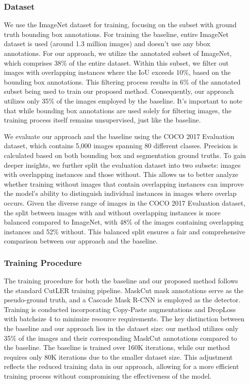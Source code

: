 \subsubsection{Dataset}
We use the ImageNet dataset for training, focusing on the subset with ground truth bounding box annotations. For training the baseline, entire ImageNet dataset is used (around 1.3 million images) and doesn't use any bbox annotations. For our approach, we utilize the annotated subset of ImageNet, which comprises 38\% of the entire dataset. Within this subset, we filter out images with overlapping instances where the IoU exceeds 10\%, based on the bounding box annotations. This filtering process results in 6\% of the annotated subset being used to train our proposed method. Consequently, our approach utilizes only 35\% of the images employed by the baseline. It's important to note that while bounding box annotations are used solely for filtering images, the training process itself remains unsupervised, just like the baseline.

We evaluate our approach and the baseline using the COCO 2017 Evaluation dataset, which contains 5,000 images spanning 80 different classes. Precision is calculated based on both bounding box and segmentation ground truths. To gain deeper insights, we further split the evaluation dataset into two subsets: images with overlapping instances and those without. This allows us to better analyze whether training without images that contain overlapping instances can improve the model's ability to distinguish individual instances in images where overlap occurs. Given the diverse range of images in the COCO 2017 Evaluation dataset, the split between images with and without overlapping instances is more balanced compared to ImageNet, with 48\% of the images containing overlapping instances and 52\% without. This balanced split ensures a fair and comprehensive comparison between our approach and the baseline.

\subsubsection{Training Procedure}
The training procedure for both the baseline and our proposed method follows the standard CutLER training pipeline. MaskCut mask annotations serve as the pseudo-ground truth, and a Cascade Mask R-CNN is employed as the detector. Training is conducted incorporating Copy-Paste augmentations and DropLoss with batchsize 4 to minimize resource requirements. The key distinction between the baseline and our approach lies in the dataset size: our method utilizes only 35\% of the images and their corresponding MaskCut annotations compared to the baseline. The baseline is trained over 160K iterations, while our method requires only 80K iterations due to the smaller dataset size. This adjustment reflects the reduced training data in our approach, allowing for a more efficient training process without compromising the effectiveness of the model.

